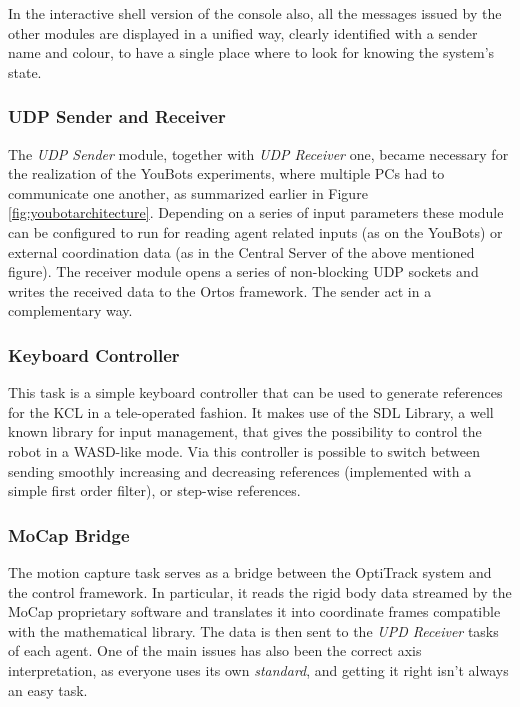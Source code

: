 In the interactive shell version of the console also, all the messages issued by the other modules are displayed in a unified way, clearly identified with a sender name and colour, to have a single place where to look for knowing the system's state.

\subsubsection{UDP Sender and Receiver}
The \textit{UDP Sender} module, together with \textit{UDP Receiver} one, became necessary for the realization of the YouBots experiments, where multiple PCs had to communicate one another, as summarized earlier in Figure \ref{fig:youbotarchitecture}. Depending on a series of input parameters these module can be configured to run for reading agent related inputs (as on the YouBots) or external coordination data (as in the Central Server of the above mentioned figure). The receiver module  opens a series of non-blocking UDP sockets and writes the received data to the Ortos framework. The sender act in a complementary way.

\subsubsection{Keyboard Controller}
This task is a simple keyboard controller that can be used to generate references for the KCL in a tele-operated fashion. It makes use of the SDL Library, a well known library for input management, that gives the possibility to control the robot in a WASD-like mode. Via this controller is possible to switch between sending smoothly increasing and decreasing references (implemented with a simple first order filter), or step-wise references. 


\subsubsection{MoCap Bridge}
The motion capture task serves as a bridge between the OptiTrack{\scriptsize \raisebox{.3em}{\texttrademark}} system and the control framework. In particular, it reads the rigid body data streamed by the MoCap proprietary software and translates it into coordinate frames compatible with the mathematical library. The data is then sent to the \textit{UPD Receiver} tasks of each agent. One of the main issues has also been the correct axis interpretation, as everyone uses its own \textit{standard}, and getting it right isn't always an easy task.


